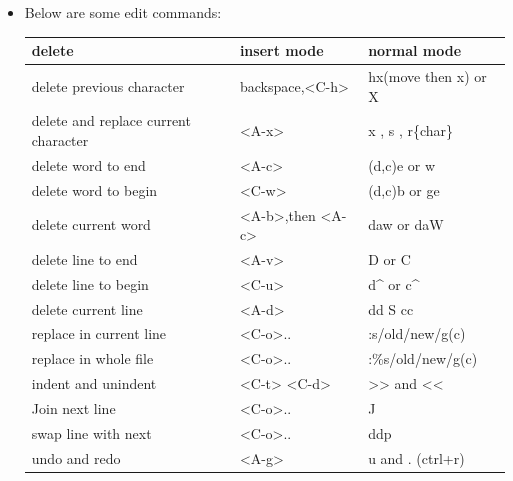 \documentclass[a4paper,12pt,twoside]{book}
\begin{document}
\begin{itemize}
\item Below are some edit commands:
\begin{center}
		\begin{tabular}{p{}|p{}|p{}}
		\hline
		delete & insert mode & normal mode\\

   	    \hline 
		delete previous character & backspace,<C-h> & hx(move then x) or X  \\
	
		\hline 
		delete and replace current character & <A-x> & x , s , r\{char\}  \\
	
		\hline 
		delete word to end & <A-c> & (d,c)e or w  \\
		
		\hline 
		delete word to begin & <C-w> &(d,c)b or ge  \\

		\hline 
		delete current word &<A-b>,then <A-c> & daw or daW \\
		
		\hline 
		delete line to end & <A-v> & D or C  \\
		
		\hline 
		delete line to begin & <C-u> & d\^{} or c\^{}  \\
		
		\hline 
		delete current line & <A-d> & dd S cc \\

       \hline
	   replace in current line &<C-o>.. & :s/old/new/g(c) \\

		\hline 
	   replace in whole file &<C-o>.. & :\%s/old/new/g(c) \\

	   \hline
		indent and unindent & <C-t> <C-d> & >> and << \\

	   \hline 
	   Join next line & <C-o>.. & J \\ 

	   \hline 
		swap line with next &<C-o>.. & ddp \\
	
		\hline 
		undo and redo & <A-g> &  u and . (ctrl+r) \\ 
		
				\end{tabular}
	\end{center}


\end{itemize}
\end{document}
